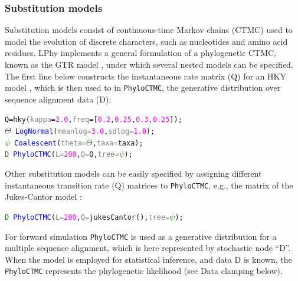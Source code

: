 \documentclass[10pt,letterpaper,table]{article}
\begin{document}
\subsubsection{Substitution models}
Substitution models consist of continuous-time Markov chains (CTMC) used to model the evolution of discrete characters, such as nucleotides and amino acid residues. 
LPhy implements a general formulation of a phylogenetic CTMC, known as the GTR model \cite{gtr}, under which several nested models can be specified. 
The first line below constructs the instantaneous rate matrix (Q) for an HKY model \cite{hasegawa1985dating}, which is then used to in \texttt{PhyloCTMC}, the generative distribution over sequence alignment data (D):

{
  \small
  \begin{listing}
    \begin{alltt}
    Q = \textcolor{magenta!80!black}{hky}(\textcolor{gray}{kappa}=\textcolor{magenta}{2.0}, \textcolor{gray}{freq}=[\textcolor{magenta}{0.2}, \textcolor{magenta}{0.25}, \textcolor{magenta}{0.3}, \textcolor{magenta}{0.25}]);
    \textcolor{green}{\(\Theta\)} ~ \textcolor{blue}{LogNormal}(\textcolor{gray}{meanlog=}\textcolor{magenta}{3.0}, \textcolor{gray}{sdlog=}\textcolor{magenta}{1.0});
    \textcolor{green}{\(\psi\)} ~ \textcolor{blue}{Coalescent}(\textcolor{gray}{theta=}\textcolor{green}{\(\Theta\)}, \textcolor{gray}{taxa=}taxa);
    \textcolor{green}{D} ~ \textcolor{blue}{PhyloCTMC}(\textcolor{gray}{L=}\textcolor{magenta}{200}, \textcolor{gray}{Q=}Q, \textcolor{gray}{tree=}\textcolor{green}{\(\psi\)});
    \end{alltt}
  \end{listing}
}

Other substitution models can be easily specified by assigning different instantaneous transition rate (Q) matrices to \texttt{PhyloCTMC}, e.g., the matrix of the Jukes-Cantor model \cite{jc69}:
{
  \small
  \begin{listing}
    \begin{alltt}
    \textcolor{green}{D} ~ \textcolor{blue}{PhyloCTMC}(\textcolor{gray}{L=}\textcolor{magenta}{200}, \textcolor{gray}{Q=}\textcolor{magenta!80!black}{jukesCantor}(), \textcolor{gray}{tree=}\textcolor{green}{\(\psi\)});
    \end{alltt}
  \end{listing}
}

For forward simulation \texttt{PhyloCTMC} is used as a generative distribution for a multiple sequence alignment, which is here represented by stochastic node ``D''. When the model is employed for statistical inference, and data D is known, the \texttt{PhyloCTMC} represents the phylogenetic likelihood (see Data clamping below).
\end{document}
